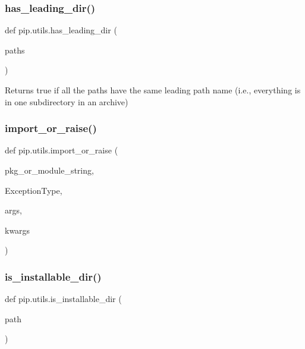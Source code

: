 \subsubsection{\texorpdfstring{has\+\_\+leading\+\_\+dir()}{has\_leading\_dir()}}
{\footnotesize\ttfamily def pip.\+utils.\+has\+\_\+leading\+\_\+dir (\begin{DoxyParamCaption}\item[{}]{paths }\end{DoxyParamCaption})}

\begin{DoxyVerb}Returns true if all the paths have the same leading path name
(i.e., everything is in one subdirectory in an archive)\end{DoxyVerb}
 \mbox{\label{namespacepip_1_1utils_a7b69957eac502b178052db8ce2deb47b}} 
\subsubsection{\texorpdfstring{import\+\_\+or\+\_\+raise()}{import\_or\_raise()}}
{\footnotesize\ttfamily def pip.\+utils.\+import\+\_\+or\+\_\+raise (\begin{DoxyParamCaption}\item[{}]{pkg\+\_\+or\+\_\+module\+\_\+string,  }\item[{}]{Exception\+Type,  }\item[{}]{args,  }\item[{}]{kwargs }\end{DoxyParamCaption})}

\mbox{\label{namespacepip_1_1utils_aeb4f7dc1a55d3477acedf5c1d4707cec}} 
\subsubsection{\texorpdfstring{is\+\_\+installable\+\_\+dir()}{is\_installable\_dir()}}
{\footnotesize\ttfamily def pip.\+utils.\+is\+\_\+installable\+\_\+dir (\begin{DoxyParamCaption}\item[{}]{path }\end{DoxyParamCaption})}

